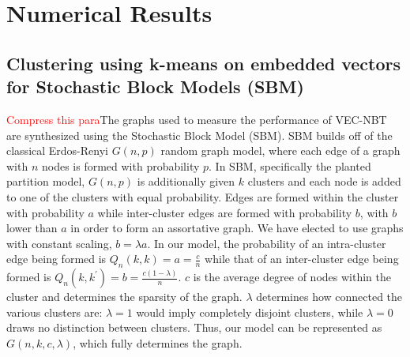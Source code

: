 \documentclass{article} %
\begin{document}
%
%

\section{Numerical Results}
\subsection{Clustering using k-means on embedded vectors for Stochastic Block Models (SBM)}

\textcolor{red}{Compress this para}The graphs used to measure the performance of VEC-NBT are synthesized using the Stochastic Block Model (SBM). SBM builds off of the classical Erdos-Renyi $G(n,p)$ random graph model, where each edge of a graph with $n$ nodes is formed with probability $p$. In SBM, specifically the planted partition model, $G(n,p)$ is additionally given $k$ clusters and each node is added to one of the clusters with equal probability. Edges are formed within the cluster with probability $a$ while inter-cluster edges are formed with probability $b$, with $b$ lower than $a$ in order to form an assortative graph. We have elected to use graphs with constant scaling, $b = \lambda a$. In our model, the probability of an intra-cluster edge being formed is $Q_n(k,k) = a = \frac{c}{n}$ while that of an inter-cluster edge being formed is $Q_n(k,k^\prime) = b = \frac{c(1-\lambda)}{n}$. $c$ is the average degree of nodes within the cluster and determines the sparsity of the graph. $\lambda$ determines how connected the various clusters are: $\lambda=1$ would imply completely disjoint clusters, while $\lambda=0$ draws no distinction between clusters.  Thus, our model can be represented as $G(n,k,c,\lambda)$, which fully determines the graph.
\end{document}

